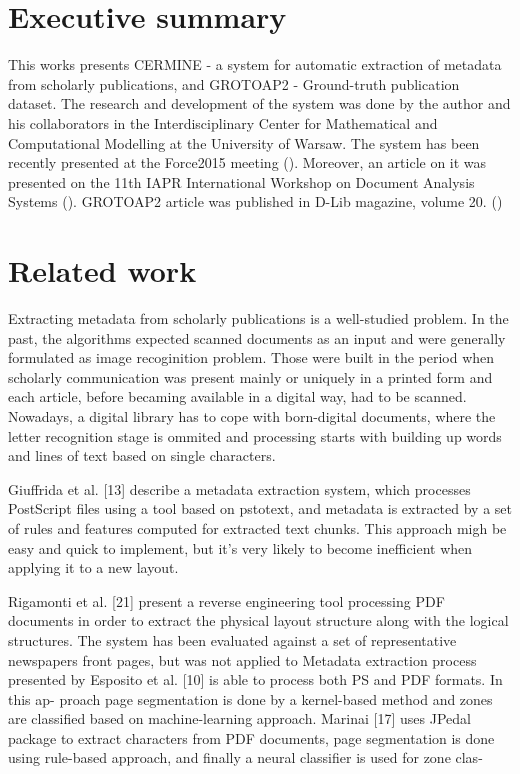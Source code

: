 \section{Executive summary}
This works presents CERMINE - a system for automatic extraction of metadata from scholarly publications, and GROTOAP2 - Ground-truth publication dataset. The research and development of the system was done by the author and his collaborators in the Interdisciplinary Center for Mathematical and Computational Modelling at the University of Warsaw. The system has been recently presented at the Force2015 meeting (\cite{Force2015}). Moreover, an article on it was presented on the 11th IAPR International Workshop on Document Analysis Systems (\cite{DominikaTkaczykPaweSzostekMateuszFedoryszakPiotrJanDendek2014}). GROTOAP2 article was published in D-Lib magazine, volume 20. (\cite{DominikaTkaczykPaweSzostek2014}) 
\section{Related work}
Extracting metadata from scholarly publications is a well-studied problem. In the past, the algorithms expected scanned documents as an input and were generally formulated as image recoginition problem. Those were built in the period when scholarly communication was present mainly or uniquely in a printed form and each article, before becaming available in a digital way, had to be scanned.
Nowadays, a digital library has to cope with born-digital documents, where the letter recognition stage is ommited and processing starts with building up words and lines of text based on single characters.


Giuffrida et al. [13] describe a metadata extraction system, which processes PostScript files using a tool
based on pstotext, and metadata is extracted by a set of rules and features computed for extracted text chunks. This approach migh be easy and quick to implement, but it's very likely to become inefficient when applying it to a new layout.

Rigamonti et al. [21] present a reverse engineering tool processing PDF documents in order to extract the physical layout structure along with the logical structures. The system has been evaluated against a set of representative newspapers front pages, but was not applied to 
Metadata extraction process presented by Esposito et al. [10]
is able to process both PS and PDF formats. In this ap-
proach page segmentation is done by a kernel-based method
and zones are classified based on machine-learning approach.
Marinai [17] uses JPedal package to extract characters from
PDF documents, page segmentation is done using rule-based
approach, and finally a neural classifier is used for zone clas-